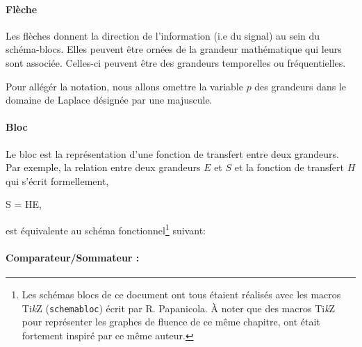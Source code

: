 \paragraph{Flèche}
Les flèches donnent la direction de l'information (i.e du signal) au sein du schéma-blocs. 
Elles peuvent être ornées de la grandeur mathématique qui leurs sont associée. 
Celles-ci peuvent être des grandeurs temporelles ou fréquentielles. 
\begin{center}
\end{center}
Pour allégér la notation, nous allons omettre la variable $p$ des grandeurs 
dans le domaine de Laplace désignée par une majuscule.

\paragraph{Bloc}

Le bloc est la représentation d'une fonction de transfert entre deux grandeurs.
Par exemple, la relation entre deux grandeurs $E$ et $S$ et la fonction de transfert $H$
qui s'écrit formellement, 
\begin{bequation}
S = HE,\label{eq-ES}
\end{bequation}

est équivalente au schéma fonctionnel\footnote{Les schémas blocs de ce document ont tous étaient réalisés 
avec les macros Ti\emph{k}Z (\verb?schemabloc?) écrit par R. Papanicola\cite{schemabloc}. 
\`A noter que des macros Ti\emph{k}Z pour représenter les graphes de fluence 
de ce même chapitre, ont était fortement inspiré par ce même auteur.} 
suivant:

\begin{center}
\end{center}


\paragraph{Comparateur/Sommateur :}

